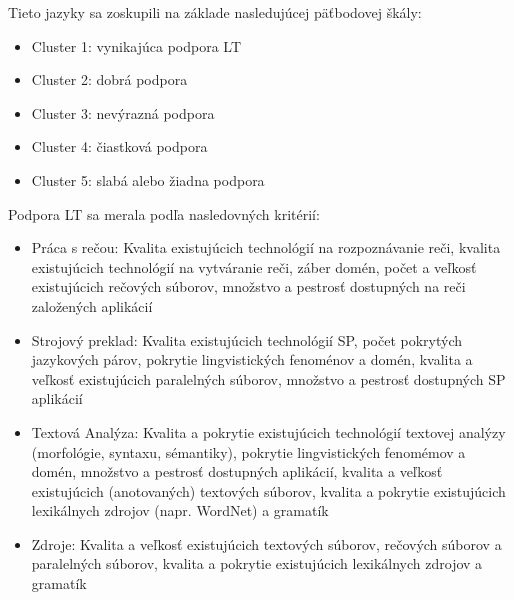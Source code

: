 Tieto jazyky sa zoskupili na základe nasledujúcej päťbodovej škály: 
\begin{itemize}
\item Cluster 1: vynikajúca podpora LT
\item Cluster 2: dobrá podpora
\item Cluster 3: nevýrazná podpora
\item Cluster 4: čiastková podpora
\item Cluster 5: slabá alebo žiadna podpora
\end{itemize}

Podpora LT sa merala podľa nasledovných kritérií:
\begin{itemize}
\item Práca s rečou: Kvalita existujúcich technológií na rozpoznávanie reči, kvalita existujúcich technológií na vytváranie reči, záber domén, počet a veľkosť existujúcich rečových súborov, množstvo a pestrosť dostupných na reči založených aplikácií
\item Strojový preklad: Kvalita existujúcich technológií SP, počet pokrytých jazykových párov, pokrytie lingvistických fenoménov a domén, kvalita a veľkosť existujúcich paralelných súborov, množstvo a pestrosť dostupných SP aplikácií
\item Textová Analýza: Kvalita a pokrytie existujúcich technológií textovej analýzy (morfológie, syntaxu, sémantiky), pokrytie lingvistických fenomémov a domén, množstvo a pestrosť dostupných aplikácií, kvalita a veľkosť existujúcich (anotovaných) textových súborov, kvalita a pokrytie existujúcich lexikálnych zdrojov (napr. WordNet) a gramatík
\item Zdroje: Kvalita a veľkosť existujúcich textových súborov, rečových súborov a paralelných súborov, kvalita a pokrytie existujúcich lexikálnych zdrojov a gramatík
\end{itemize} 